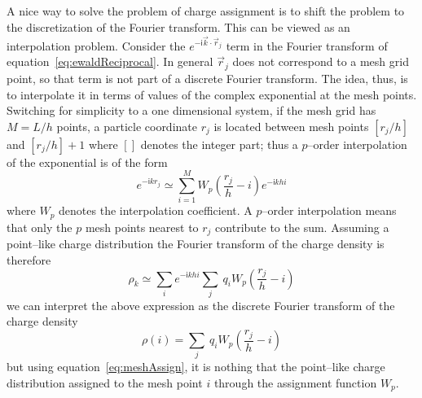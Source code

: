 A nice way to solve the problem of charge assignment is to shift the problem to the discretization of the Fourier transform. This can be viewed as an interpolation problem. Consider the $e^{-\mathsf{i}\vec k\cdot \vec r_j}$ term in the Fourier transform of equation~\eqref{eq:ewaldReciprocal}. In general $\vec r_j$ does not correspond to a mesh grid point, so that term is not part of a discrete Fourier transform. The idea, thus, is to interpolate it in terms of values of the complex exponential at the mesh points. Switching for simplicity to a one dimensional system, if the mesh grid has $M = L/h$ points, a particle coordinate $r_j$ is located between mesh points $[r_j/h]$ and $[r_j/h] + 1$ where $[ ]$ denotes the integer part; thus a $p$--order interpolation of the exponential is of the form
\begin{equation*}
	e^{-\mathsf{i}kr_j} \simeq \sum_{i=1}^M W_{p}\left ( \frac{r_j}{h} - i \right ) e^{-\mathsf{i}khi}
\end{equation*}
where $W_{p}$ denotes the interpolation coefficient. A $p$--order interpolation means that only the $p$ mesh points nearest to $r_j$ contribute to the sum. Assuming a point--like charge distribution the Fourier transform of the charge density is therefore
\begin{equation*}
	\rho_k \simeq \sum_{i}e^{-\mathsf{i}khi} \sum_j\ q_iW_{p} \left ( \frac{r_j}{h} - i \right )
\end{equation*}
we can interpret the above expression as the discrete Fourier transform of the charge density
\begin{equation*}
	\rho(i) = \sum_j\ q_iW_{p} \left ( \frac{r_j}{h} - i \right )
\end{equation*}
but using equation~\eqref{eq:meshAssign}, it is nothing that the point--like charge distribution assigned to the mesh point $i$ through the assignment function $W_{p}$.

